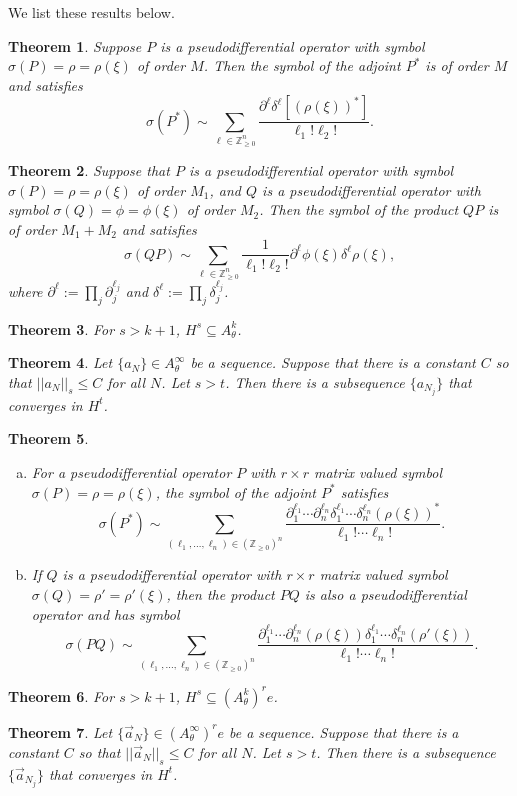 \documentclass[10pt]{article}
\newtheorem{thm}{Theorem}[section]
\theoremstyle{remark}
\theoremstyle{definition}
\begin{document}
We list these results below.
\begin{thm}
Suppose $P$ is a pseudodifferential operator with symbol
$\sigma(P)=\rho=\rho(\xi)$ of order $M$.
Then the symbol of the adjoint $P^*$ is of order $M$ and satisfies
$$\sigma(P^*)\sim\sum_{\ell\in\mathbb Z_{\ge 0}^n}
\frac{\partial^{\ell}\delta^{\ell}[(\rho(\xi))^*]}
{\ell_1!\ell_2!}.$$
\end{thm}
\begin{thm}
Suppose that $P$ is a pseudodifferential operator with symbol
$\sigma(P)=\rho=\rho(\xi)$ of order $M_1$, and $Q$ is a pseudodifferential
operator with symbol $\sigma(Q)=\phi=\phi(\xi)$ of order $M_2$.
Then the symbol of the product $QP$ is of order $M_1+M_2$ and satisfies
$$\sigma(QP)\sim\sum_{\ell\in\mathbb Z_{\ge 0}^n}
\frac{1}{\ell_1!\ell_2!}\partial^{\ell}\phi(\xi)\delta^{\ell}\rho(\xi),$$
where $\partial^{\ell}:=\prod_j\partial_j^{\ell_j}$
and $\delta^{\ell}:=\prod_j\delta_j^{\ell_j}$.
\end{thm}
\begin{thm}
For $s>k+1$, $H^s\subseteq A_{\theta}^k$.
\end{thm}
\begin{thm}
Let $\{a_N\}\in A_{\theta}^{\infty}$ be a sequence. Suppose that there
is a constant $C$ so that $||a_N||_s\le C$ for all $N$. Let $s>t$. Then
there is a subsequence $\{a_{N_j}\}$ that converges in $H^t$.
\end{thm}
\begin{thm}
\begin{enumerate}[(a)]
\item For a pseudodifferential operator $P$ with $r\times r$ matrix valued
symbol $\sigma(P)=\rho=\rho(\xi)$, the
symbol of the adjoint $P^*$ satisfies
$$\sigma(P^*)\sim\sum_{(\ell_1,\ldots,\ell_n)\in(\mathbb Z_{\ge 0})^n}
\frac{\partial_1^{\ell_1}\cdots\partial_n^{\ell_n}
\delta_1^{\ell_1}\cdots\delta_n^{\ell_n}(\rho(\xi))^*}{\ell_1!\cdots\ell_n!}.$$
\item If $Q$ is a pseudodifferential operator with $r\times r$ matrix valued symbol
$\sigma(Q)=\rho'=\rho'(\xi)$,
then the product $PQ$ is also a pseudodifferential operator and has symbol
$$\sigma(PQ)\sim\sum_{(\ell_1,\ldots,\ell_n)\in(\mathbb Z_{\ge 0})^n}
\frac{\partial_1^{\ell_1}\cdots\partial_n^{\ell_n}(\rho(\xi))
\delta_1^{\ell_1}\cdots\delta_n^{\ell_n}(\rho'(\xi))}{\ell_1!\cdots\ell_n!}.$$
\end{enumerate}
\end{thm}
\begin{thm}
For $s>k+1$, $H^s\subseteq(A_{\theta}^k)^re$.
\end{thm}
\begin{thm}
Let $\{\vec{a}_N\}\in(A_{\theta}^{\infty})^re$ be a sequence. Suppose that there
is a constant $C$ so that $||\vec{a}_N||_s\le C$ for all $N$. Let $s>t$. Then
there is a subsequence $\{\vec{a}_{N_j}\}$ that converges in $H^t$.
\end{thm}
\end{document}
